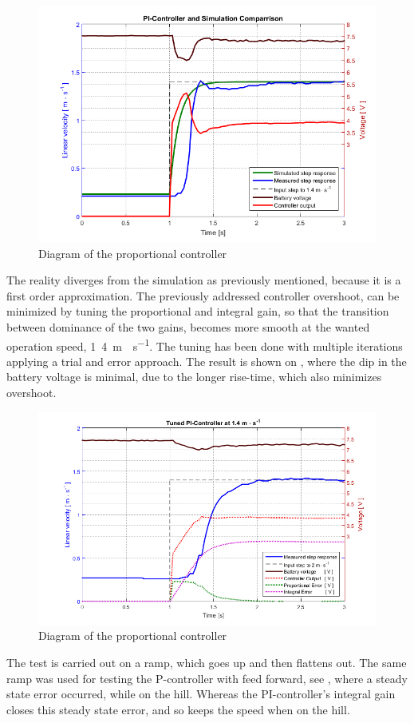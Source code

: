 %
\begin{figure}[H]
 	\centering
 	\includegraphics[width=.8\textwidth]{figures/CalculatedPI}
 	\caption{Diagram of the proportional controller}
 	\label{fig:CalculatedPI}
\end{figure}
%
The reality diverges from the simulation as previously mentioned, because it is a first order approximation. The previously addressed controller overshoot, can be minimized by tuning the proportional and integral gain, so that the transition between dominance of the two gains, becomes more smooth at the wanted operation speed, \si{1.4 m\cdot s^{-1}}. The tuning has been done with multiple iterations applying a trial and error approach. The result is shown on , where the dip in the battery voltage is minimal, due to the longer rise-time, which also minimizes overshoot. 
%
\begin{figure}[H]
 	\centering
 	\includegraphics[width=.8\textwidth]{figures/TunedPI}
 	\caption{Diagram of the proportional controller}
 	\label{fig:TunedPI}
\end{figure}
%
The test is carried out on a ramp, which goes up and then flattens out. The same ramp was used for testing the P-controller with feed forward, see , where a steady state error occurred, while on the hill. Whereas the PI-controller's integral gain closes this steady state error, and so keeps the speed when on the hill.